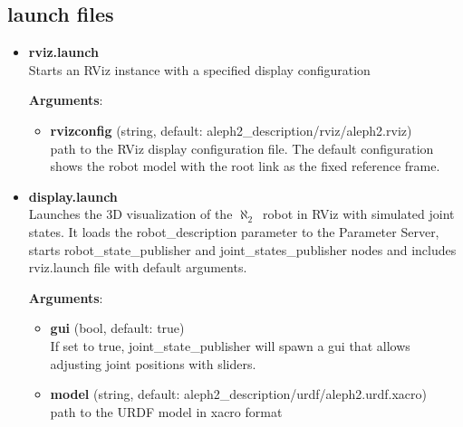\documentclass[english,inz,shortabstract]{iithesis}
\newcommand{\rovername}{$\aleph_2$\ }
\begin{document}
    \subsection{launch files}
    
        \begin{itemize}
            \item \textbf{\textsf{rviz.launch}}\\
            Starts an RViz instance with a specified display configuration

            \textbf{Arguments}:
            \begin{itemize}[itemsep=0pt, parsep=2pt, topsep=0pt]
                \item \textbf{rvizconfig} (\textsf{string}, default: \textsf{aleph2\_description/rviz/aleph2.rviz})\\
                path to the RViz display configuration file. The default configuration shows the robot model with the root link as the fixed reference frame.
            \end{itemize}

            \item \textbf{\textsf{display.launch}}\\
            Launches the 3D visualization of the \rovername robot in RViz with simulated joint states. It loads the \textsf{robot\_description} parameter to the Parameter Server, starts \textsf{robot\_state\_publisher} and \textsf{joint\_states\_publisher} nodes and includes \textsf{rviz.launch} file with default arguments.

            \textbf{Arguments}:
            \begin{itemize}[itemsep=0pt, parsep=2pt, topsep=0pt]
                \item \textbf{gui} (\textsf{bool}, default: \textsf{true})\\
                If set to \textsf{true}, \textsf{joint\_state\_publisher} will spawn a gui that allows adjusting joint positions with sliders.
                \item \textbf{model} (\textsf{string}, default: \textsf{aleph2\_description/urdf/aleph2.urdf.xacro})\\
                path to the URDF model in xacro format
            \end{itemize}
        \end{itemize}
\end{document}
